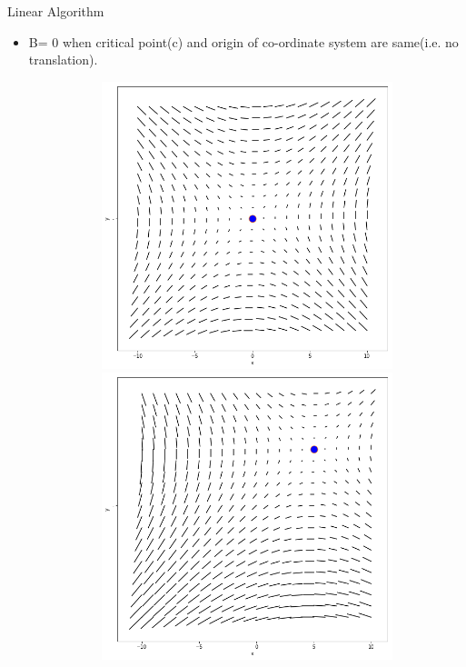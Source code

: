 \documentclass{beamer}
\begin{document}
\begin{frame}{Linear Algorithm}
\begin{itemize}
\item B= 0 when critical point(c) and origin of co-ordinate system are same(i.e. no translation).

\begin{figure}[h]
	\centering     
	
	
	\begin{subfigure}[b]{0.4\textwidth}
		
		\begin{minipage}{.5\textwidth}
			\centering
			\includegraphics[width= 0.8\linewidth]{images/crit_adj2.png}
			
		\end{minipage}%
		\begin{minipage}{.5\textwidth}
			\centering
			\includegraphics[width=.8\linewidth]{images/crit_adj1.png}
			

\end{minipage}
\end{subfigure}
\end{figure}
\end{itemize}
\end{frame}
\end{document}

